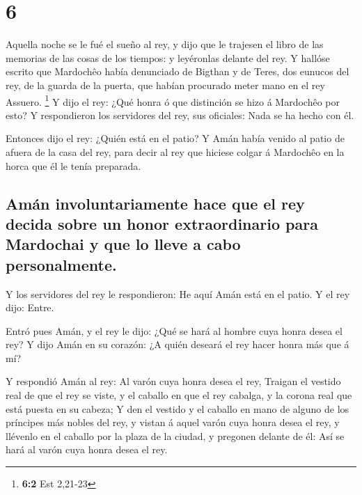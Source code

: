 \hypertarget{section-5}{%
\section{6}\label{section-5}}

 Aquella noche se le fué el sueño al rey, y dijo que le
trajesen el libro de las memorias de las cosas de los tiempos: y
leyéronlas delante del rey.  Y hallóse escrito que
Mardochêo había denunciado de Bigthan y de Teres, dos eunucos del rey,
de la guarda de la puerta, que habían procurado meter mano en el rey
Assuero. \footnote{\textbf{6:2} Est 2,21-23}  Y dijo el
rey: ¿Qué honra ó que distinción se hizo á Mardochêo por esto? Y
respondieron los servidores del rey, sus oficiales: Nada se ha hecho con
él.

 Entonces dijo el rey: ¿Quién está en el patio? Y Amán
había venido al patio de afuera de la casa del rey, para decir al rey
que hiciese colgar á Mardochêo en la horca que él le tenía preparada.

\hypertarget{amuxe1n-involuntariamente-hace-que-el-rey-decida-sobre-un-honor-extraordinario-para-mardochai-y-que-lo-lleve-a-cabo-personalmente.}{%
\subsection{Amán involuntariamente hace que el rey decida sobre un honor
extraordinario para Mardochai y que lo lleve a cabo
personalmente.}\label{amuxe1n-involuntariamente-hace-que-el-rey-decida-sobre-un-honor-extraordinario-para-mardochai-y-que-lo-lleve-a-cabo-personalmente.}}

 Y los servidores del rey le respondieron: He aquí Amán
está en el patio. Y el rey dijo: Entre.

 Entró pues Amán, y el rey le dijo: ¿Qué se hará al hombre
cuya honra desea el rey? Y dijo Amán en su corazón: ¿A quién deseará el
rey hacer honra más que á mí?

 Y respondió Amán al rey: Al varón cuya honra desea el
rey,  Traigan el vestido real de que el rey se viste, y el
caballo en que el rey cabalga, y la corona real que está puesta en su
cabeza;  Y den el vestido y el caballo en mano de alguno
de los príncipes más nobles del rey, y vistan á aquel varón cuya honra
desea el rey, y llévenlo en el caballo por la plaza de la ciudad, y
pregonen delante de él: Así se hará al varón cuya honra desea el rey.

